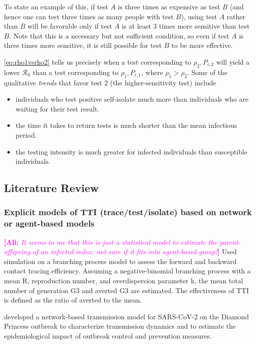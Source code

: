 \documentclass[12pt]{article}
\newcommand{\comment}{\showcomment}
\newcommand{\showcomment}[3]{\textcolor{#1}{\textbf{[#2: }\textsl{#3}\textbf{]}}}
\newcommand{\ali}[1]{\comment{magenta}{Ali}{#1}}
\newcommand{\Rnum}{\mathcal{R}_0}
\theoremstyle{definition} %
\begin{document}
To state an example of this, if test $A$ is three times as expensive as test $B$ (and hence one can test three times as many people with test $B$), using test $A$ rather than $B$ will be favorable only if test $A$ is at least 3 times more sensitive than test $B$. Note that this is a necessary but not sufficient condition, so even if test $A$ is three times more sensitive, it is still possible for test $B$ to be more effective. 

\cref{eq:rho1vsrho2} tells us precisely when a test corresponding to $\rho_2, P_{i,2}$ will yield a lower $\Rnum$ than a test corresponding to $\rho_1, P_{i,1}$, where $\rho_1 > \rho_2$. Some of the qualitative \textit{trends} that favor test 2 (the higher-sensitivity test) include

\begin{itemize}
    \item individuals who test positive self-isolate much more than individuals who are waiting for their test result.
    \item the time it takes to return tests is much shorter than the mean infectious period.
    \item the testing intensity is much greater for infected individuals than susceptible individuals.
\end{itemize}


\subsection{Literature Review}

\subsubsection{Explicit models of TTI (trace/test/isolate) based on network or agent-based models}
\citep{endo2020implication} \ali{It seems to me that this is just a statistical model to estimate the parent-offspring of an infected index, not sure if it fits into agent-based group!} Used simulation on a branching process model to assess the forward and backward contact tracing efficiency. Assuming a negative-binomial branching process with a mean R, reproduction number, and overdispersion parameter k, the mean total number of generation G3 and averted G3 are estimated. The effectiveness of TTI is defined as the ratio of averted to the mean.

\citep{jenness2020modeling} developed a network-based transmission model for SARS-CoV-2 on the Diamond Princess outbreak to characterize transmission dynamics and to estimate the epidemiological impact of outbreak control and prevention measures. 
\end{document}
